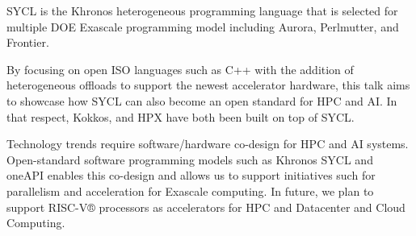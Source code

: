 SYCL is the Khronos heterogeneous programming language that is selected for multiple DOE Exascale programming model including Aurora, Perlmutter, and Frontier.

By focusing on open ISO languages such as C++ with the addition of heterogeneous offloads to support the newest accelerator hardware, this talk aims to showcase how SYCL can also become an open standard for HPC and AI. In that respect, Kokkos, and HPX have both been built on top of SYCL.

Technology trends require software/hardware co-design for HPC and AI systems. Open-standard software programming models such as Khronos SYCL and oneAPI enables this co-design and allows us to support initiatives such for parallelism and acceleration for Exascale computing. In future, we plan to support RISC-V® processors as accelerators for HPC and Datacenter and Cloud Computing. 
